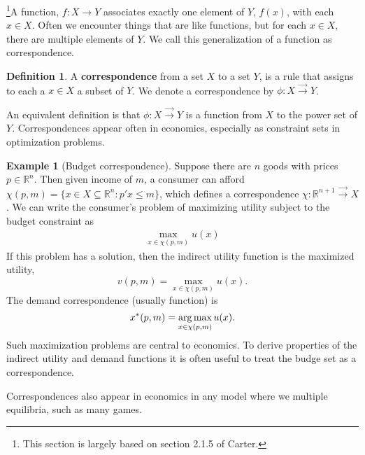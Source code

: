 \documentclass[12pt,reqno]{amsart}
\theoremstyle{definition}
\newtheorem{definition}{Definition}[section]
\newtheorem{example}{Example}[section]
\newcommand{\argmax}{\operatornamewithlimits{arg\,max}}
\def\R{\mathbb{R}}
\renewcommand{\to}{{\rightarrow}}
\newcommand{\corres}{\overrightarrow{\rightarrow}}
\begin{document}
\footnote{This section is largely based on section 2.1.5 of Carter.}A
function, $f:X \to Y$ associates exactly one element of $Y$, $f(x)$,
with each $x \in X$. Often we encounter things that are like
functions, but for each $x \in X$, there are multiple elements of
$Y$. We call this generalization of a function as correspondence. 
\begin{definition}
  A \textbf{correspondence} from a set $X$ to a set $Y$, is a rule
  that assigns to each a $x \in X$ a subset of $Y$. We denote a
  correspondence by $\phi: X \corres Y$.
\end{definition}
An equivalent definition is that $\phi: X \corres Y$ is a function
from $X$ to the power set of $Y$. Correspondences appear often in
economics, especially as constraint sets in optimization problems.
\begin{example}[Budget correspondence]
  Suppose there are $n$ goods with prices $p \in \R^n$. Then given
  income of $m$, a consumer can afford $\chi(p,m)=\{ x \in X \subseteq
  \R^n: p'x \leq m\}$, which defines a correspondence $\chi: \R^{n+1}
  \corres X$. We can write the consumer's problem of maximizing
  utility subject to the budget constraint as
  \begin{align*}
    \max_{x \in \chi(p,m)} u(x) 
  \end{align*}
  If this problem has a solution, then the indirect utility function
  is the maximized utility,
  \[ v(p,m) = \max_{x \in \chi(p,m)} u(x). \]
  The demand correspondence (usually function) is
  \[ x^*(p,m) = \argmax_{x \in \chi(p,m)} u(x). \] 
  Such maximization problems are central to economics. To derive
  properties of the indirect utility and demand functions it is often
  useful to treat the budge set as a correspondence.
\end{example}
Correspondences also appear in economics in any model where we
multiple equilibria, such as many games. 
\end{document}
